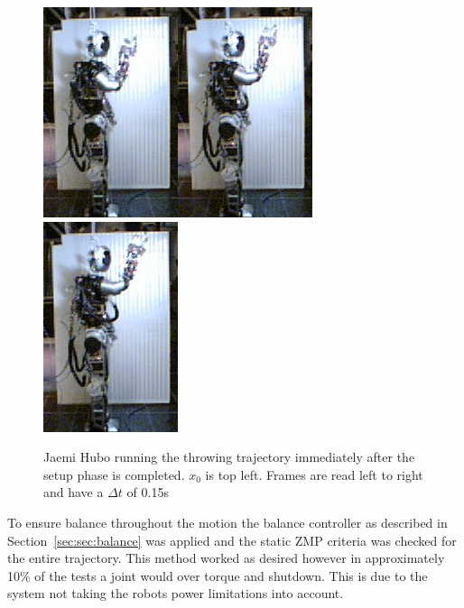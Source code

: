 \begin{figure}[ht]
\includegraphics[width=0.25\columnwidth]{./pix/slowMotion/5.png}\includegraphics[width=0.25\columnwidth]{./pix/slowMotion/6.png}\includegraphics[width=0.25\columnwidth]{./pix/slowMotion/7.png}
  \caption{Jaemi Hubo running the throwing trajectory immediately after the setup phase is completed.  $x_0$ is top left.  Frames are read left to right and have a $\Delta t$ of 0.15s\cite{dlofaro-srm}}
  \label{fig:3dThrowReal}
\end{figure}

To ensure balance throughout the motion the balance controller as described in Section~\ref{sec:sec:balance} was applied and the static ZMP criteria was checked for the entire trajectory.
This method worked as desired however in approximately 10\% of the tests a joint would over torque and shutdown.  
This is due to the system not taking the robots power limitations into account. 

